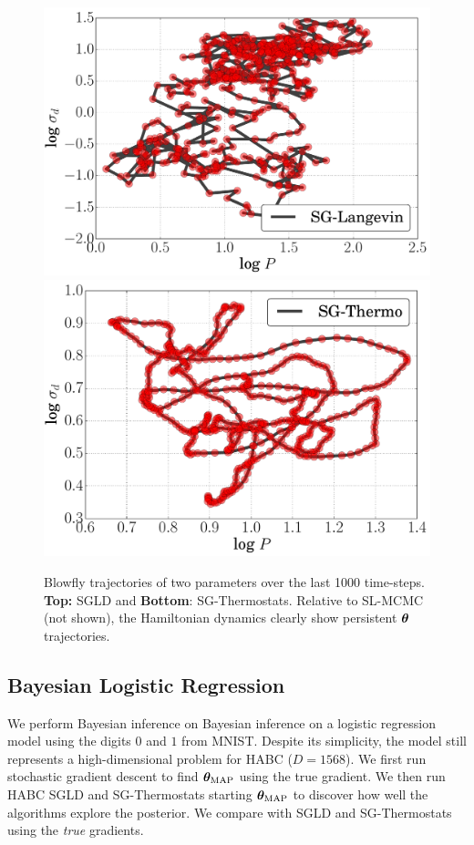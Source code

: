 \documentclass[]{article}
\begin{document}
\begin{figure}[t]
\vskip 0.2in
\begin{center}
\includegraphics[width=0.75\columnwidth]{./images/blowfly/non-sticky-theta-2d-SG-Langevin.pdf}
\includegraphics[width=0.75\columnwidth]{./images/blowfly/non-sticky-theta-2d-SG-Thermo.pdf}
\vspace{-0.15in}
\caption{\small{Blowfly trajectories of two parameters over the last 1000 time-steps.  {\bf Top:} SGLD and {\bf Bottom}: SG-Thermostats.  Relative to SL-MCMC (not shown), the Hamiltonian dynamics clearly show persistent ${\bm \theta}$ trajectories.}}
\label{fig:bf-two-d-theta}
\end{center}
\vspace{-0.1in}
\end{figure}

\vspace{-0.1in}
\subsection{Bayesian Logistic Regression}\label{sec:auto}
We perform Bayesian inference on Bayesian inference on a logistic regression model using the digits $0$ and $1$ from MNIST.  Despite its simplicity, the model still represents a high-dimensional problem for HABC ($D=1568$).  We first run stochastic gradient descent to find ${\bm \theta}_{\text{MAP}}$ using the true gradient.  We then run HABC SGLD and SG-Thermostats starting  ${\bm \theta}_{\text{MAP}}$ to discover how well the algorithms explore the posterior.  We compare with SGLD and SG-Thermostats using the {\em true} gradients.  
\end{document}
